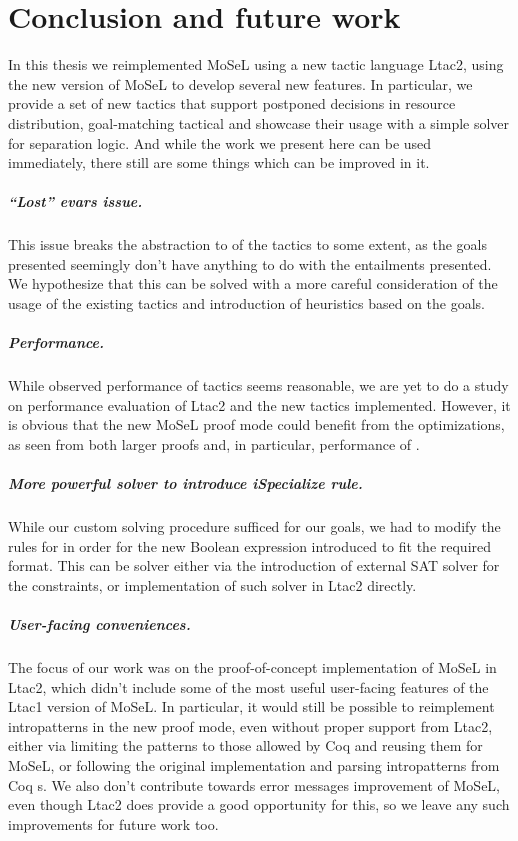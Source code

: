 \chapter{Conclusion and future work}

\vspace{-2em}
In this thesis we reimplemented MoSeL using a new tactic language Ltac2, using the new version of MoSeL to develop several new features.
In particular, we provide a set of new tactics that support postponed decisions in resource distribution, goal-matching tactical and showcase their usage with a simple solver for separation logic.
And while the work we present here can be used immediately, there still are some things which can be improved in it.
\paragraph{``Lost'' evars issue.}
  This issue breaks the abstraction to of the tactics to some extent, as the goals presented seemingly don't have anything to do with the entailments presented.
  We hypothesize that this can be solved with a more careful consideration of the usage of the existing tactics and introduction of heuristics based on the goals.
\paragraph{Performance.}
  While observed performance of tactics seems reasonable, we are yet to do a study on performance evaluation of Ltac2 and the new tactics implemented.
  However, it is obvious that the new MoSeL proof mode could benefit from the optimizations, as seen from both larger proofs and, in particular, performance of .
\paragraph{More powerful solver to introduce iSpecialize rule.}
  While our custom solving procedure sufficed for our goals, we had to modify the rules for  in order for the new Boolean expression introduced to fit the required format.
  This can be solver either via the introduction of external SAT solver for the constraints, or implementation of such solver in Ltac2 directly.
\paragraph{User-facing conveniences.}
  The focus of our work was on the proof-of-concept implementation of MoSeL in Ltac2, which didn't include some of the most useful user-facing features of the Ltac1 version of MoSeL.
  In particular, it would still be possible to reimplement intropatterns in the new proof mode, even without proper support from Ltac2, either via limiting the patterns to those allowed by Coq and reusing them for MoSeL, or following the original implementation and parsing intropatterns from Coq s.
  We also don't contribute towards error messages improvement of MoSeL, even though Ltac2 does provide a good opportunity for this, so we leave any such improvements for future work too.
